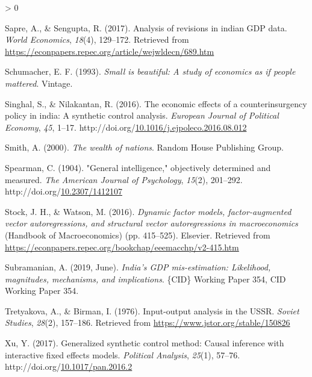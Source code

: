 \documentclass[12pt,nobind, a4paper]{reedthesis}
\newlength{\cslhangindent}
\newenvironment{CSLReferences}[2] %
{%
	\setlength{\parindent}{0pt}
	\ifodd #1 \everypar{\setlength{\hangindent}{\cslhangindent}}\ignorespaces\fi
	\ifnum #2 > 0
	\setlength{\parskip}{#2\baselineskip}
	\fi
}%
{}
\begin{document}
\begin{CSLReferences}{1}{0}
 \leavevmode\hypertarget{ref-sapre_analysis_2017}{}%
 Sapre, A., \& Sengupta, R. (2017). Analysis of revisions in indian {GDP} data. \emph{World Economics}, \emph{18}(4), 129--172. Retrieved from \url{https://econpapers.repec.org/article/wejwldecn/689.htm}

 \leavevmode\hypertarget{ref-schumacher_small_1993}{}%
 Schumacher, E. F. (1993). \emph{Small is beautiful: A study of economics as if people mattered}. Vintage.

 \leavevmode\hypertarget{ref-singhal_economic_2016}{}%
 Singhal, S., \& Nilakantan, R. (2016). The economic effects of a counterinsurgency policy in india: A synthetic control analysis. \emph{European Journal of Political Economy}, \emph{45}, 1--17. http://doi.org/\href{https://doi.org/10.1016/j.ejpoleco.2016.08.012}{10.1016/j.ejpoleco.2016.08.012}

 \leavevmode\hypertarget{ref-smith_wealth_2000}{}%
 Smith, A. (2000). \emph{The wealth of nations}. Random House Publishing Group.

 \leavevmode\hypertarget{ref-spearman_general_1904}{}%
 Spearman, C. (1904). "General intelligence," objectively determined and measured. \emph{The American Journal of Psychology}, \emph{15}(2), 201--292. http://doi.org/\href{https://doi.org/10.2307/1412107}{10.2307/1412107}

 \leavevmode\hypertarget{ref-stock_dynamic_2016}{}%
 Stock, J. H., \& Watson, M. (2016). \emph{Dynamic factor models, factor-augmented vector autoregressions, and structural vector autoregressions in macroeconomics} (Handbook of Macroeconomics) (pp. 415--525). Elsevier. Retrieved from \url{https://econpapers.repec.org/bookchap/eeemacchp/v2-415.htm}

 \leavevmode\hypertarget{ref-subramanian_indias_2019}{}%
 Subramanian, A. (2019, June). \emph{India's {GDP} mis-estimation: Likelihood, magnitudes, mechanisms, and implications}. \{CID\} Working Paper 354, {CID} Working Paper 354.

 \leavevmode\hypertarget{ref-tretyakova_input-output_1976}{}%
 Tretyakova, A., \& Birman, I. (1976). Input-output analysis in the {USSR}. \emph{Soviet Studies}, \emph{28}(2), 157--186. Retrieved from \url{https://www.jstor.org/stable/150826}

 \leavevmode\hypertarget{ref-xu_generalized_2017}{}%
 Xu, Y. (2017). Generalized synthetic control method: Causal inference with interactive fixed effects models. \emph{Political Analysis}, \emph{25}(1), 57--76. http://doi.org/\href{https://doi.org/10.1017/pan.2016.2}{10.1017/pan.2016.2}

 \end{CSLReferences}
	
	
\end{document}
